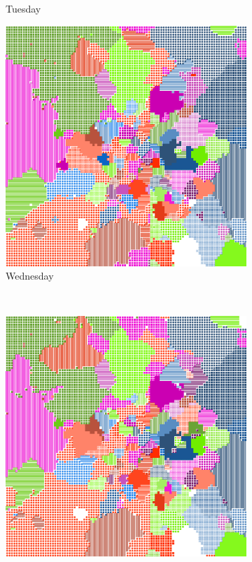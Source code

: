 \documentclass[12pt,a4paper]{article}
\begin{document}
\begin{figure}[H]
\begin{subfigure}[b]{0.30\textwidth}
\caption{Tuesday}
\end{subfigure}
\begin{subfigure}[b]{0.30\textwidth}
\includegraphics[width=\textwidth]{weekDef/3Wed.png}
\caption{Wednesday}
\end{subfigure}
\\
\begin{subfigure}[b]{0.30\textwidth}
\includegraphics[width=\textwidth]{weekDef/4Thu.png}

\end{subfigure}
\end{figure}
\end{document}
